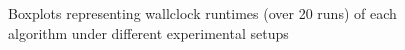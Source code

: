 


\begin{figure}
\centerline{%
\hfil
{}
\hfil
{}
}
\caption{Boxplots representing wallclock runtimes (over 20 runs) of each algorithm under different experimental setups}
\label{fig:wallclock-times}
\end{figure}

